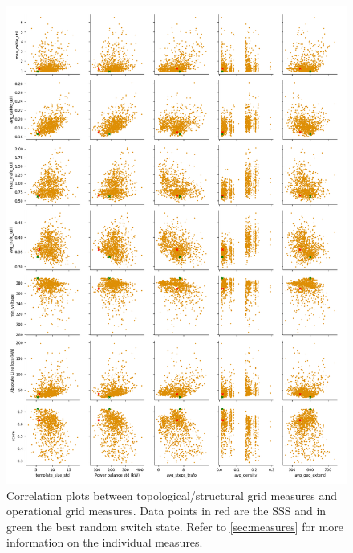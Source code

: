 \begin{figure}[H]
  \begin{center}
      \includegraphics[width=\linewidth]{img/switchstate_exploring/suburb2/correleation.png}
  \end{center}
  \caption{
    Correlation plots between topological/structural grid measures and 
    operational grid measures. Data points in red are the SSS and in green the best random switch state.
    Refer to \autoref{sec:measures} for more
    information on the individual measures.
  }
  \label{fig:appendix:suburb2:correleation}
\end{figure}